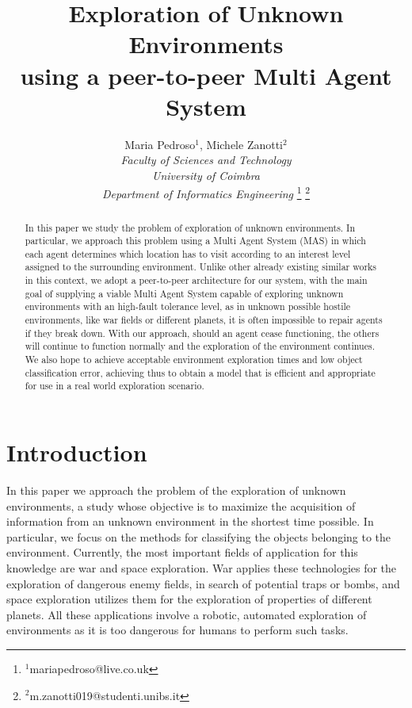 \documentclass[a4paper, 10pt, conference]{ieeeconf}      %
\title{\LARGE \bf
Exploration of Unknown Environments\\ using a peer-to-peer Multi Agent System
}
\author{Maria Pedroso$^{1}$, Michele Zanotti$^{2}$\\\emph{Faculty of Sciences and Technology}\\\emph{University of Coimbra}\\\emph{Department of Informatics Engineering}%
\thanks{$^{1}$mariapedroso@live.co.uk}%
\thanks{$^{2}$m.zanotti019@studenti.unibs.it}%
}
\begin{document}
\maketitle
\thispagestyle{empty}
\pagestyle{empty}


\begin{abstract}

In this paper we study the problem of exploration of unknown environments. In particular, we approach this problem using a Multi Agent System (MAS) in which each agent determines which location has to visit according to an interest level assigned to the surrounding environment. Unlike other already existing similar works in this context, we adopt a peer-to-peer architecture for our system, with the main goal of supplying a viable Multi Agent System capable of exploring unknown environments with an high-fault tolerance level, as in unknown possible hostile environments, like war fields or different planets, it is often impossible to repair agents if they break down. With our approach, should an agent cease functioning, the others will continue to function normally and the exploration of the environment continues. We also hope to achieve acceptable environment exploration times and low object classification error, achieving thus to obtain a model that is efficient and appropriate for use in a real world exploration scenario.      

\end{abstract}


\section{Introduction} 
In this paper we approach the problem of the exploration of unknown environments, a study whose objective is to maximize the acquisition of information from an unknown environment in the shortest time possible. In particular, we focus on the methods for classifying the objects belonging to the environment. Currently, the most important fields of application for this knowledge are war and space exploration. War applies these technologies for the exploration of dangerous enemy fields, in search of potential traps or bombs, and space exploration utilizes them for the exploration of properties of different planets. All these applications involve a robotic, automated exploration of environments as it is too dangerous for humans to perform such tasks.
\end{document}
